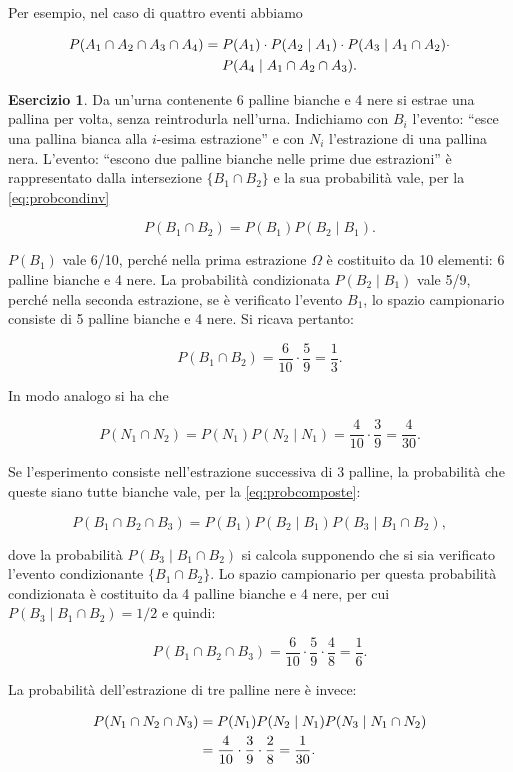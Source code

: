 \documentclass[
  11pt,
]{krantz}
\theoremstyle{definition}
\theoremstyle{definition}
\theoremstyle{definition}
\newtheorem{exercise}{Esercizio}[chapter]
\theoremstyle{definition}
\theoremstyle{remark}
\begin{document}
Per esempio, nel caso di quattro eventi abbiamo

\begin{equation}
\begin{split}
P(A_1 \cap A_2 \cap A_3 \cap A_4) = {}& P(A_1) \cdot P(A_2 \mid A_1) \cdot  P(A_3 \mid A_1 \cap A_2) \cdot \\
 & P(A_4 \mid A_1 \cap A_2 \cap A_{3}).\notag
\end{split}
\end{equation}

\begin{exercise}
Da un'urna contenente 6 palline bianche e 4 nere si estrae una pallina per volta, senza reintrodurla nell'urna. Indichiamo con \(B_i\) l'evento: ``esce una pallina bianca alla \(i\)-esima estrazione'' e con \(N_i\) l'estrazione di una pallina nera. L'evento: ``escono due palline bianche nelle prime due estrazioni'' è rappresentato dalla intersezione \(\{B_1 \cap B_2\}\) e la sua probabilità vale, per la \eqref{eq:probcondinv}

\[
P(B_1 \cap B_2) = P(B_1)P(B_2 \mid B_1).
\]

\(P(B_1)\) vale 6/10, perché nella prima estrazione \(\Omega\) è costituito da 10 elementi: 6 palline bianche e 4 nere. La probabilità condizionata \(P(B_2 \mid B_1)\) vale 5/9, perché nella seconda estrazione, se è verificato l'evento \(B_1\), lo spazio campionario consiste di 5 palline bianche e 4 nere. Si ricava pertanto:

\[
P(B_1 \cap B_2) = \frac{6}{10} \cdot \frac{5}{9} = \frac{1}{3}.
\]

In modo analogo si ha che

\[
P(N_1 \cap N_2) = P(N_1)P(N_2 \mid N_1) = \frac{4}{10} \cdot \frac{3}{9} = \frac{4}{30}.
\]

Se l'esperimento consiste nell'estrazione successiva di 3 palline, la probabilità che queste siano tutte bianche vale, per la \eqref{eq:probcomposte}:

\[
P(B_1 \cap B_2 \cap B_3)=P(B_1)P(B_2 \mid B_1)P(B_3 \mid B_1 \cap B_2),
\]

dove la probabilità \(P(B_3 \mid B_1 \cap B_2)\) si calcola supponendo che si sia verificato l'evento condizionante \(\{B_1 \cap B_2\}\). Lo spazio campionario per questa probabilità condizionata è costituito da 4 palline bianche e 4 nere, per cui \(P(B_3 \mid B_1 \cap B_2) = 1/2\) e quindi:

\[
P (B_1 \cap B_2 \cap B_3) = \frac{6}{10}\cdot\frac{5}{9} \cdot\frac{4}{8}  = \frac{1}{6}.
\]

La probabilità dell'estrazione di tre palline nere è invece:

\[
\begin{aligned}
P(N_1 \cap N_2 \cap N_3) &= P(N_1)P(N_2 \mid N_1)P(N_3 \mid N_1 \cap N_2)\notag\\ 
&= \frac{4}{10} \cdot \frac{3}{9} \cdot \frac{2}{8} = \frac{1}{30}.\notag
\end{aligned}
\]
\end{exercise}
\end{document}
